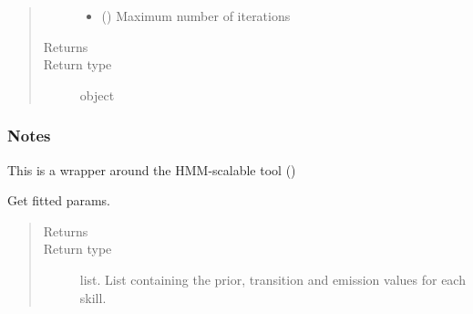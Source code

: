 \documentclass[letterpaper,10pt,english]{sphinxmanual}
\begin{document}
\begin{fulllineitems}
\begin{fulllineitems}
\begin{quote}
\begin{description}
\begin{itemize}
\item {} 
 (\sphinxstyleliteralemphasis{\sphinxupquote{, }}) \textendash{} Maximum number of iterations

\end{itemize}

\item[{Returns}] \leavevmode
{}

\item[{Return type}] \leavevmode
object

\end{description}\end{quote}
\subsubsection*{Notes}

This is a wrapper around the HMM-scalable tool ()

\end{fulllineitems}


\begin{fulllineitems}
\label{\detokenize{bkt:bkt.BKT.get_params}}
Get fitted params.
\begin{quote}\begin{description}
\item[{Returns}] \leavevmode
{}

\item[{Return type}] \leavevmode
list. List containing the prior, transition and emission values for each skill.

\end{description}\end{quote}

\end{fulllineitems}



\end{fulllineitems}
\end{document}
